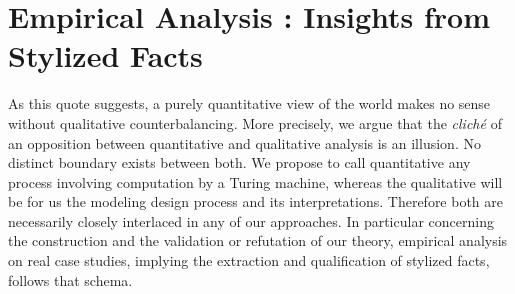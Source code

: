 


\chapter{Empirical Analysis : Insights from Stylized Facts} %

\label{ch:empirical} %





\bigskip












As this quote suggests, a purely quantitative view of the world makes no sense without qualitative counterbalancing. More precisely, we argue that the \textit{clich{\'e}} of an opposition between quantitative and qualitative analysis is an illusion. No distinct boundary exists between both. We propose to call quantitative any process involving computation by a Turing machine, whereas the qualitative will be for us the modeling design process and its interpretations. Therefore both are necessarily closely interlaced in any of our approaches. In particular concerning the construction and the validation or refutation of our theory, empirical analysis on real case studies, implying the extraction and qualification of stylized facts, follows that schema.


